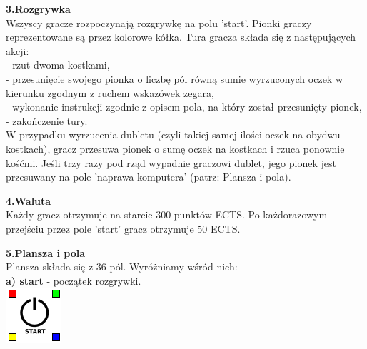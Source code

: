 \documentclass[a4paper]{article}
\begin{document}
\noindent \textbf{3.Rozgrywka}\\
\noindent Wszyscy gracze rozpoczynają rozgrywkę na polu 'start'. Pionki graczy reprezentowane są przez kolorowe kółka. Tura gracza składa się z następujących akcji:\\
- rzut dwoma kostkami,\\
- przesunięcie swojego pionka o liczbę pól równą sumie wyrzuconych oczek w kierunku zgodnym z ruchem wskazówek zegara,\\
- wykonanie instrukcji zgodnie z opisem pola, na który został przesunięty pionek,\\
- zakończenie tury.\\
W przypadku wyrzucenia dubletu (czyli takiej samej ilości oczek na obydwu kostkach), gracz przesuwa pionek o sumę oczek na kostkach i rzuca ponownie kośćmi. Jeśli trzy razy pod rząd wypadnie graczowi dublet, jego pionek jest przesuwany na pole 'naprawa komputera' (patrz: Plansza i pola). 
\vspace{10pt}

\noindent \textbf{4.Waluta}\\
\noindent Każdy gracz otrzymuje na starcie 300 punktów ECTS. Po każdorazowym przejściu przez pole 'start' gracz otrzymuje 50 ECTS.
\vspace{10pt}

\noindent \textbf{5.Plansza i pola}\\
Plansza składa się z 36 pól. Wyróżniamy wśród nich:\\
\noindent \textbf{a) start} - początek rozgrywki.\\ 
\indent\includegraphics[scale=0.8]{start.png}\\
\end{document}
